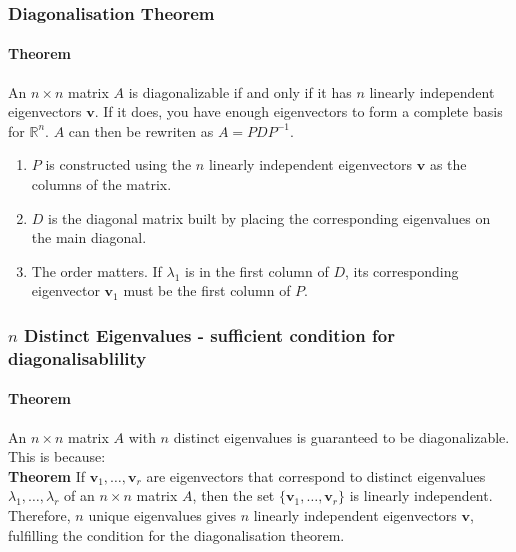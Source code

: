 \documentclass[../linear-algebra.tex]{subfiles}
\begin{document}
\subsubsection{Diagonalisation Theorem}
\paragraph{Theorem} An $n \times n$ matrix $A$ is diagonalizable if and only if it has $n$ linearly independent eigenvectors $\mathbf{v}$. If it does, you have enough eigenvectors to form a complete basis for $\mathbb{R}^n$.
$A$ can then be rewriten as $A = PDP^{-1}$.
\begin{enumerate}
    \item $P$ is constructed using the $n$ linearly independent eigenvectors $\mathbf{v}$ as the columns of the matrix.
    \item $D$ is the diagonal matrix built by placing the corresponding eigenvalues on the main diagonal.
    \item The order matters. If $\lambda_1$ is in the first column of $D$, its corresponding eigenvector $\mathbf{v}_1$ must be the first column of $P$.
\end{enumerate}

\subsubsection{$n$ Distinct Eigenvalues - sufficient condition for diagonalisablility}
\paragraph{Theorem} An $n \times n$ matrix $A$ with $n$ distinct eigenvalues is guaranteed to be diagonalizable.\\
This is because:
\\
\textbf{Theorem} If $\mathbf{v}_1,\ldots,\mathbf{v}_r$ are eigenvectors that correspond to distinct eigenvalues $\lambda_1,\ldots,\lambda_r$ of an $n\times n$ matrix $A$,
then the set $\{\mathbf{v}_1,\ldots,\mathbf{v}_r\}$ is linearly independent.\\
Therefore, $n$ unique eigenvalues gives $n$ linearly independent eigenvectors $\mathbf{v}$, fulfilling the condition for the diagonalisation theorem.\\
\end{document}
